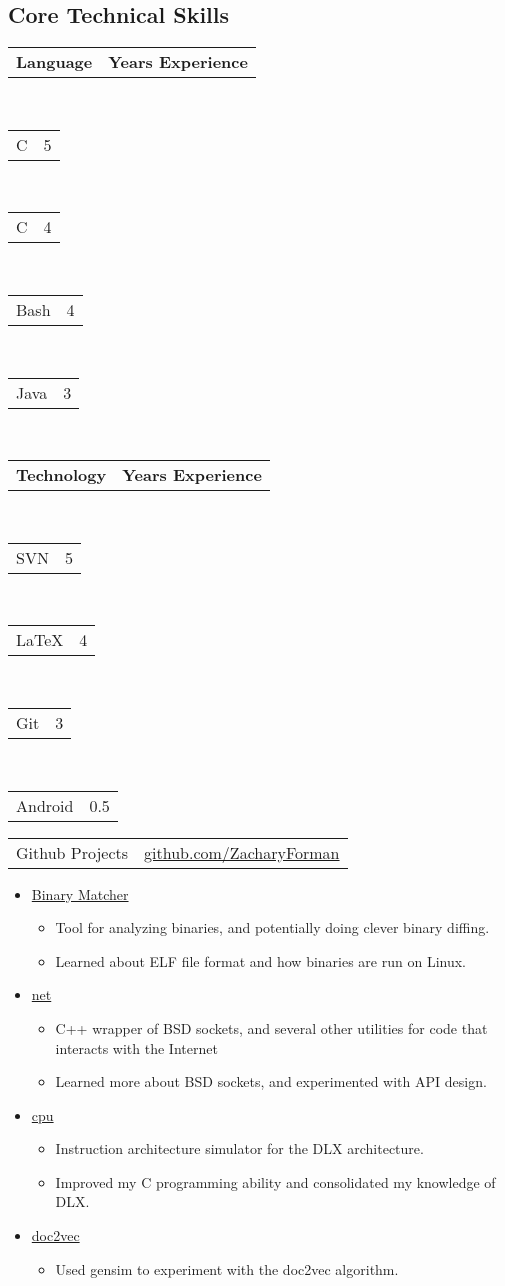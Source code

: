 \documentclass[10pt,letterpaper]{article}
\makeatletter
\newenvironment{indentsection}[1]%
{\begin{list}{}%
  {\setlength{\leftmargin}{#1}}%
  \item[]%
}
{\end{list}}
\newcommand{\headerrow}[2]
{\begin{tabular*}{\linewidth}{l@{\extracolsep{\fill}}r}
  #1 &
  #2 \\
\end{tabular*}}
\newcommand{\CPP}
{C\nolinebreak[4]\hspace{-.05em}\raisebox{.22ex}{\footnotesize\bf ++}}
\makeatother
\begin{document}
\subsection*{Core Technical Skills}

\begin{indentsection}{\parindent}
\begin{multicols}{2}
  \headerrow {\textbf{Language}} {\textbf{Years Experience}}\\
  \headerrow {\CPP} {5}\\
  \headerrow {C} {4}\\
  \headerrow {Bash} {4}\\
  \headerrow {Java} {3}\\
  \headerrow {\textbf{Technology}} {\textbf{Years Experience}}\\
  \headerrow {SVN} {5}\\
  \headerrow {\LaTeX} {4}\\
  \headerrow {Git} {3}\\
  \headerrow {Android} {0.5}
\end{multicols}
\end{indentsection}

\newpage

\headerrow
  {Github Projects}
  {\href{https://www.github.com/ZacharyForman}{github.com/ZacharyForman}}
  \begin{itemize}
    \item \href{https://github.com/ZacharyForman/Binary_Matcher}{Binary Matcher}
      \begin{itemize}
        \item Tool for analyzing binaries, and potentially doing clever
              binary diffing.
        \item Learned about ELF file format and how binaries are run on Linux.
      \end{itemize}
    \item \href{https://github.com/ZacharyForman/net}{net}
      \begin{itemize}
        \item C++ wrapper of BSD sockets, and several other utilities for
              code that interacts with the Internet
        \item Learned more about BSD sockets, and experimented with API
              design.
      \end{itemize}
    \item \href{https://github.com/ZacharyForman/cpu}{cpu}
      \begin{itemize}
        \item Instruction architecture simulator for the DLX architecture.
        \item Improved my C programming ability and consolidated my knowledge
              of DLX.
      \end{itemize}
    \item \href{https://github.com/mbd-doc2vec-team/mbd-doc2vec}{doc2vec}
      \begin{itemize}
        \item Used gensim to experiment with the doc2vec algorithm.
      \end{itemize}
  \end{itemize}
\end{document}
